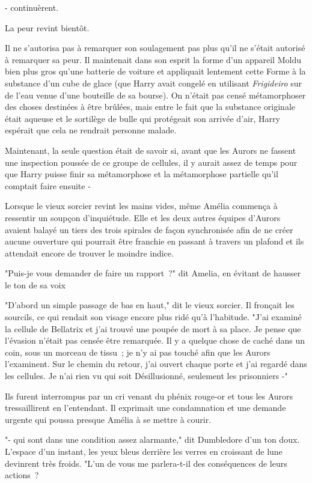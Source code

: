 - continuèrent.

La peur revint bientôt.

Il ne s'autorisa pas à remarquer son soulagement pas plus qu'il ne s'était autorisé à remarquer sa peur. Il maintenait dans son esprit la forme d'un appareil Moldu bien plus gros qu'une batterie de voiture et appliquait lentement cette Forme à la substance d'un cube de glace (que Harry avait congelé en utilisant \emph{Frigideiro} sur de l'eau venue d'une bouteille de sa bourse). On n'était pas censé métamorphoser des choses destinées à être brûlées, mais entre le fait que la substance originale était aqueuse et le sortilège de bulle qui protégeait son arrivée d'air, Harry espérait que cela ne rendrait personne malade.

Maintenant, la seule question était de savoir si, avant que les Aurors ne fassent une inspection poussée de ce groupe de cellules, il y aurait assez de temps pour que Harry puisse finir sa métamorphose et la métamorphose partielle qu'il comptait faire ensuite -

\later

Lorsque le vieux sorcier revint les mains vides, même Amélia commença à ressentir un soupçon d'inquiétude. Elle et les deux autres équipes d'Aurors avaient balayé un tiers des trois spirales de façon synchronisée afin de ne créer aucune ouverture qui pourrait être franchie en passant à travers un plafond et ils attendait encore de trouver le moindre indice.

"Puis-je vous demander de faire un rapport~?" dit Amelia, en évitant de hausser le ton de sa voix

"D'abord un simple passage de bas en haut," dit le vieux sorcier. Il fronçait les sourcils, ce qui rendait son visage encore plus ridé qu'à l'habitude. "J'ai examiné la cellule de Bellatrix et j'ai trouvé une poupée de mort à sa place. Je pense que l'évasion n'était pas censée être remarquée. Il y a quelque chose de caché dans un coin, sous un morceau de tissu~; je n'y ai pas touché afin que les Aurors l'examinent. Sur le chemin du retour, j'ai ouvert chaque porte et j'ai regardé dans les cellules. Je n'ai rien vu qui soit Désillusionné, seulement les prisonniers -"

Ils furent interrompus par un cri venant du phénix rouge-or et tous les Aurors tressaillirent en l'entendant. Il exprimait une condamnation et une demande urgente qui poussa presque Amélia à se mettre à courir.

"- qui sont dans une condition assez alarmante," dit Dumbledore d'un ton doux. L'espace d'un instant, les yeux bleus derrière les verres en croissant de lune devinrent très froids. "L'un de vous me parlera-t-il des conséquences de leurs actions~?

